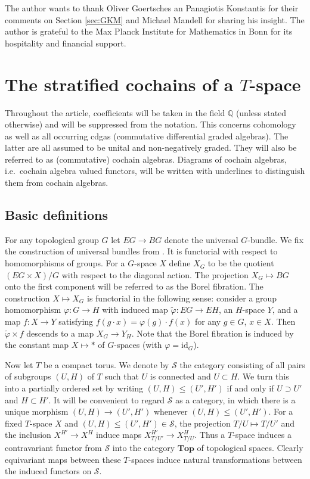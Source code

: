 \documentclass[12pt,a4paper]{article}
\newcommand{\id}{\mathrm{id}}
\theoremstyle{definition}
\begin{document}
 The author wants to thank Oliver Goertsches an Panagiotis Konstantis for their comments on Section \ref{sec:GKM} and Michael Mandell for sharing his insight. The author is grateful to the Max Planck Institute for Mathematics in Bonn for its hospitality and financial support.

\section{The stratified cochains of a $T$-space}

Throughout the article, coefficients will be taken in the field $\mathbb{Q}$ (unless stated otherwise) and will be suppressed from the notation. This concerns cohomology as well as all occurring cdgas (commutative differential graded algebras). The latter are all assumed to be unital and non-negatively graded. They will also be referred to as (commutative) cochain algebras. Diagrams of cochain algebras, i.e.\ cochain algebra valued functors, will be written with underlines to distinguish them from cochain algebras.

\subsection{Basic definitions}

For any topological group $G$ let $EG\rightarrow BG$ denote the universal $G$-bundle. We fix the construction of universal bundles from \cite{Milnor}. It is functorial with respect to homomorphisms of groups. For a $G$-space $X$ define $X_G$ to be the quotient $(EG\times X)/G$ with respect to the diagonal action. The projection $X_G\mapsto BG$ onto the first component will be referred to as the Borel fibration. The construction $X\mapsto X_G$ is functorial in the following sense: consider a group homomorphism $\varphi\colon G\rightarrow H$ with induced map $\tilde{\varphi}\colon EG\rightarrow EH$, an $H$-space $Y$, and a map $f\colon X\rightarrow Y$ satisfying $f(g\cdot x)=\varphi(g)\cdot f(x)$ for any $g\in G$, $x\in X$. Then $\tilde{\varphi}\times f$ descends to a map $X_G\rightarrow Y_H$.
Note that the Borel fibration is induced by the constant map $X\mapsto *$ of $G$-spaces (with $\varphi=\id_G$).

Now let $T$ be a compact torus. We denote by $\mathcal{S}$ the category consisting of all pairs of subgroups $(U,H)$ of $T$ such that $U$ is connected and $U\subset H$. We turn this into a partially ordered set by writing $(U,H)\leq (U',H')$ if and only if $U\supset U'$ and $H\subset H'$. It will be convenient to regard $\mathcal{S}$ as a category, in which there is a unique morphism $(U,H)\rightarrow (U',H')$ whenever $(U,H)\leq (U',H')$.
For a fixed $T$-space $X$ and $(U,H)\leq (U',H')\in \mathcal{S}$, the projection $T/U\mapsto T/U'$ and the inclusion $X^{H'}\rightarrow X^H$ induce maps $X_{T/U'}^{H'}\rightarrow X_{T/U}^{H}$. Thus a $T$-space induces a contravariant functor from $\mathcal{S}$ into the category $\textbf{Top}$ of topological spaces. Clearly equivariant maps between these $T$-spaces induce natural transformations between the induced functors on $\mathcal{S}$.
\end{document}
